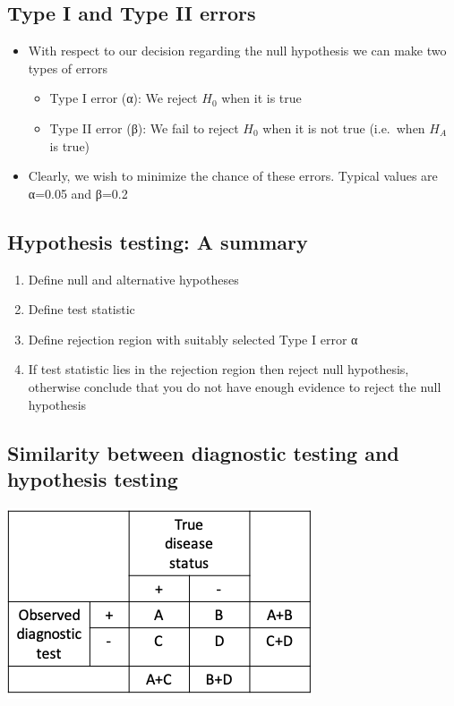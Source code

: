 \documentclass[
]{book}
\providecommand{\tightlist}{%
  \setlength{\itemsep}{0pt}\setlength{\parskip}{0pt}}
\begin{document}
\hypertarget{type-i-and-type-ii-errors}{%
\subsection{Type I and Type II errors}\label{type-i-and-type-ii-errors}}

\begin{itemize}
\tightlist
\item
  With respect to our decision regarding the null hypothesis we can make two types of errors

  \begin{itemize}
  \tightlist
  \item
    Type I error (α): We reject \(H_0\) when it is true
  \item
    Type II error (β): We fail to reject \(H_0\) when it is not true (i.e.~when \(H_A\) is true)
  \end{itemize}
\item
  Clearly, we wish to minimize the chance of these errors. Typical values are α=0.05 and β=0.2
\end{itemize}

\hypertarget{hypothesis-testing-a-summary}{%
\subsection{Hypothesis testing: A summary}\label{hypothesis-testing-a-summary}}

\begin{enumerate}
\def\labelenumi{\arabic{enumi}.}
\tightlist
\item
  Define null and alternative hypotheses
\item
  Define test statistic
\item
  Define rejection region with suitably selected Type I error α
\item
  If test statistic lies in the rejection region then reject null hypothesis, otherwise conclude that you do not have enough evidence to reject the null hypothesis
\end{enumerate}

\hypertarget{similarity-between-diagnostic-testing-and-hypothesis-testing}{%
\subsection{Similarity between diagnostic testing and hypothesis testing}\label{similarity-between-diagnostic-testing-and-hypothesis-testing}}

\includegraphics[width=0.5\linewidth]{./4_21a}
\end{document}
